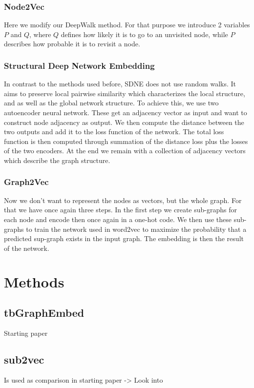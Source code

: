 \documentclass[sigconf]{acmart}
\begin{document}
\subsubsection*{Node2Vec}
Here we modify our DeepWalk method. For that purpose we introduce 2 variables \(P\) and \(Q\), where \(Q\) defines how likely it is to go to an unvisited node,
while \(P\) describes how probable it is to revisit a node.

\subsubsection*{Structural Deep Network Embedding}
In contrast to the methods used before, SDNE does not use random walks. It aims to preserve local pairwise similarity which characterizes the local structure, and 
as well as the global network structure.
To achieve this, we use two autoencoder neural network. These get an adjacency vector as input and want to construct node adjacency as output.
We then compute the distance between the two outputs and add it to the loss function of the network.
The total loss function is then computed through summation of the distance loss plus the losses of the two encoders.
At the end we remain with a collection of adjacency vectors which describe the graph structure.

\subsubsection*{Graph2Vec}
Now we don't want to represent the nodes as vectors, but the whole graph. For that we have once again three steps. 
In the first step we create sub-graphs for each node and encode then once again in a one-hot code. We then use these sub-graphs to train the network used in 
word2vec to maximize the probability that a predicted sup-graph exists in the input graph. The embedding is then the result of the network.
\cite{EmbeddingSummary}
\newpage
\section{Methods}

\subsection{tbGraphEmbed}
Starting paper
\subsection{sub2vec}
Is used as comparison in starting paper -> Look into
\end{document}
